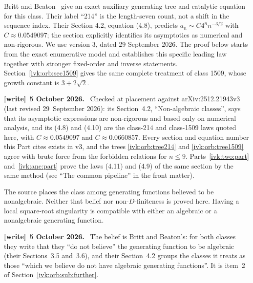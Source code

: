 \documentclass[11pt,letterpaper]{article}
\theoremstyle{remark}\newtheorem{remark}[theorem]{Remark}
\newenvironment{writenote}[1][]{\par\smallskip\begingroup\small
 \noindent\textbf{[write]}\if\relax\detokenize{#1}\relax\else~\textbf{#1.}\fi\ }%
 {\par\endgroup\smallskip}
\begin{document}
Britt and Beaton~\cite[Section 3.5]{bb} give an exact auxiliary generating
tree and catalytic equation for this class. Their label ``214'' is the
length-seven count, not a shift in the sequence index. Their Section 4.2,
equation (4.8), predicts $a_n\sim C4^n n^{-3/2}$ with $C\approx0.0549097$;
the section explicitly identifies its asymptotics as numerical and
non-rigorous. We use version 3, dated 29 September 2026. The proof below
starts from the exact enumerative model and establishes this specific
leading law together with stronger fixed-order and inverse statements. Section~\ref{ivk:orb:sec1509}
gives the same complete treatment of class 1509, whose growth constant
is $3+2\sqrt2$.
\begin{writenote}[5 October 2026]
Checked at placement against arXiv:2512.21943v3 (last revised 29~September 2026): its Section~4.2, ``Non-algebraic classes'', says that its asymptotic expressions are non-rigorous and based only on numerical analysis, and its (4.8) and (4.10) are the class-214 and class-1509 laws quoted here, with $C\approx0.0549097$ and $C\approx0.0660857$. Every section and equation number this Part cites exists in v3, and the trees \eqref{ivk:orb:tree214} and \eqref{ivk:orb:tree1509} agree with brute force from the forbidden relations for $n\le9$. Parts~\ref{ivk:two:part} and~\ref{ivk:anc:part} prove the laws (4.11) and (4.9) of the same section by the same method (see ``The common pipeline'' in the front matter).
\end{writenote}


The source places the class among generating functions believed to be
nonalgebraic. Neither that belief nor non-$D$-finiteness is proved here.
Having a local square-root singularity is compatible with either an
algebraic or a nonalgebraic generating function.
\begin{writenote}[5 October 2026]
The belief is Britt and Beaton's: for both classes they write that they ``do not believe'' the generating function to be algebraic (their Sections~3.5 and~3.6), and their Section~4.2 groups the classes it treats as those ``which we believe do not have algebraic generating functions''. It is item~2 of Section~\ref{ivk:orb:sub:further}.
\end{writenote}
\end{document}
